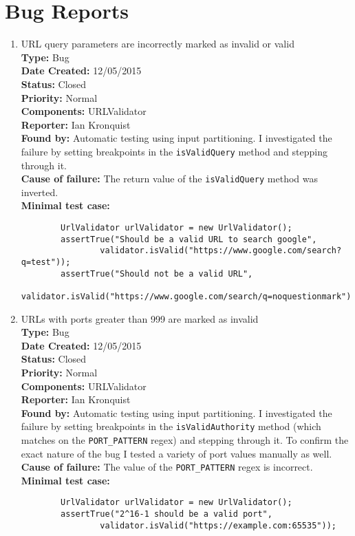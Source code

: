 \documentclass[12pt,letterpaper]{article}
\begin{document}
\bigskip

\section{Bug Reports}
\begin{enumerate}
    \item URL query parameters are incorrectly marked as invalid or valid\\
    \textbf{Type:} Bug\\
    \textbf{Date Created:} 12/05/2015\\
    \textbf{Status:} Closed\\
    \textbf{Priority:} Normal\\
    \textbf{Components:} URLValidator\\
    \textbf{Reporter:} Ian Kronquist\\

    \textbf{Found by:} Automatic testing using input partitioning. I investigated the failure by setting breakpoints in the \texttt{isValidQuery} method and stepping through it.\\
    \textbf{Cause of failure:} The return value of the \texttt{isValidQuery} method was inverted.\\
    \textbf{Minimal test case:}
    \begin{verbatim}
        UrlValidator urlValidator = new UrlValidator();
        assertTrue("Should be a valid URL to search google",
                validator.isValid("https://www.google.com/search?q=test"));
        assertTrue("Should not be a valid URL",
                validator.isValid("https://www.google.com/search/q=noquestionmark"));
    \end{verbatim}


    \item URLs with ports greater than 999 are marked as invalid\\
    \textbf{Type:} Bug\\
    \textbf{Date Created:} 12/05/2015\\
    \textbf{Status:} Closed\\
    \textbf{Priority:} Normal\\
    \textbf{Components:} URLValidator\\
    \textbf{Reporter:} Ian Kronquist\\

    \textbf{Found by:} Automatic testing using input partitioning. I investigated the failure by setting breakpoints in the \texttt{isValidAuthority} method (which matches on the \texttt{PORT\_PATTERN} regex) and stepping through it. To confirm the exact nature of the bug I tested a variety of port values manually as well.\\
    \textbf{Cause of failure:} The value of the \texttt{PORT\_PATTERN} regex is incorrect.\\
    \textbf{Minimal test case:}
    \begin{verbatim}
        UrlValidator urlValidator = new UrlValidator();
        assertTrue("2^16-1 should be a valid port",
                validator.isValid("https://example.com:65535"));


\end{verbatim}
\end{enumerate}
\end{document}
